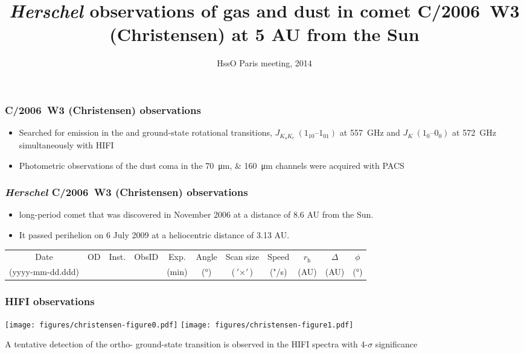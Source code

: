 \documentclass{beamer}
\newcommand{\herschel}{{\it Herschel}}
\newcommand{\christensen}{C/2006~W3 (Christensen)}
\newcommand{\rh}{r_\mathrm{h}}
\newcommand{\trans}{$J_{K_\mathrm{a} K_\mathrm{c}}\ (1_{10}\text{--}1_{01})$}
\newcommand{\nh}{$J_K\ (1_{0}\text{--}0_{0})$}
\newcommand\Fontvi{\fontsize{6}{7.2}\selectfont}
\begin{document}
\title{\herschel{} observations of gas and dust in comet
\christensen{} at  5 AU from the Sun}
\date{HssO Paris meeting, 2014}

\frame{\titlepage}

\begin{frame}
\frametitle{\christensen{} observations}
  \begin{itemize}
  \item Searched for emission in the  and 
  ground-state rotational transitions, \trans{} at
  \SI{557}{\giga\hertz} and \nh{} at \SI{572}{\giga\hertz}
  simultaneously with HIFI
  \item Photometric observations of the dust coma in the
  \SIlist{70;160}{\um} channels were acquired with PACS
  \end{itemize}
\end{frame}

\begin{frame}
\frametitle{\herschel{} \christensen{} observations}
  \begin{itemize}
  \item long-period comet that was discovered in November 2006 at a distance of
8.6 AU from the Sun.
  \item It passed perihelion on 6 July 2009 at a heliocentric distance of 3.13
AU.
  \end{itemize}
  \Fontvi
  \begin{table}
    \centering
    \begin{tabular}{c S[table-format = 3] c
		    S[table-format = 10,
		    table-space-text-post = \textsuperscript{\emph{h}}]
		    S[table-format = 2.1]
		    S[table-format = 3]
		    c c c c S
		    }
      \toprule
      Date &
      {OD} &
      Inst. & {ObsID} & {Exp.} &
      {Angle} &
      {Scan size} &
      {Speed} &
      $\rh$ &
      $\Delta$ &
      {$\phi$}\\
      (yyyy-mm-dd.ddd) & & & & {(\si{\minute})} &
      {(\si{\degree})} & {($\si{\arcmin} \times \si{\arcmin}$)} &
      {("/s)} &
      (AU) & (AU) & {(\si{\degree})}\\
      \midrule
      
      \bottomrule
    \end{tabular}
  \end{table}
\end{frame}

\begin{frame}
\frametitle{HIFI observations}
\texttt{[image: figures/christensen-figure0.pdf]}
\texttt{[image: figures/christensen-figure1.pdf]}

A tentative detection of the ortho- ground-state transition is
observed in the HIFI spectra with 4-$\sigma$ significance
\end{frame}
\end{document}
